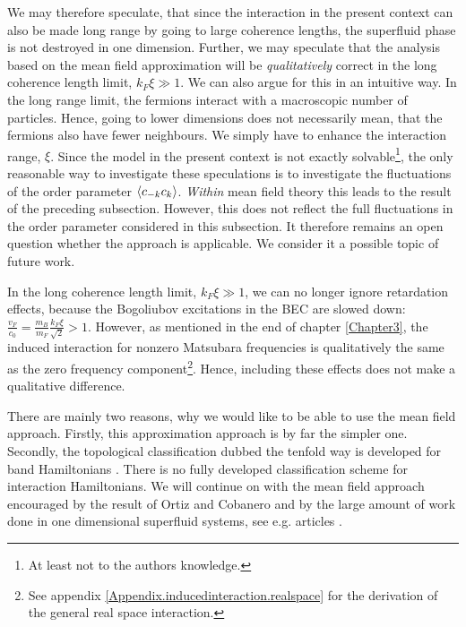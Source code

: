 We may therefore speculate, that since the interaction in the present context can also be made long range by going to large coherence lengths, the superfluid phase is not destroyed in one dimension. Further, we may speculate that the analysis based on the mean field approximation will be \textit{qualitatively} correct in the long coherence length limit, $k_F\xi \gg 1$. We can also argue for this in an intuitive way. In the long range limit, the fermions interact with a macroscopic number of particles. Hence, going to lower dimensions does not necessarily mean, that the fermions also have fewer neighbours. We simply have to enhance the interaction range, $\xi$. Since the model in the present context is not exactly solvable\footnote{At least not to the authors knowledge.}, the only reasonable way to investigate these speculations is to investigate the fluctuations of the order parameter $\braket{c_{-k}c_k}$. \textit{Within} mean field theory this leads to the result of the preceding subsection. However, this does not reflect the full fluctuations in the order parameter considered in this subsection. It therefore remains an open question whether the approach is applicable. We consider it a possible topic of future work. 

In the long coherence length limit, $k_F\xi \gg 1$, we can no longer ignore retardation effects, because the Bogoliubov excitations in the BEC are slowed down: $\frac{v_F}{c_0} = \frac{m_B}{m_F}\frac{k_F\xi}{\sqrt{2}} > 1$. However, as mentioned in the end of chapter \ref{Chapter3}, the induced interaction for nonzero Matsubara frequencies is qualitatively the same as the zero frequency component\footnote{See appendix \ref{Appendix.inducedinteraction.realspace} for the derivation of the general real space interaction.}. Hence, including these effects does not make a qualitative difference.

There are mainly two reasons, why we would like to be able to use the mean field approach. Firstly, this approximation approach is by far the simpler one. Secondly, the topological classification dubbed the tenfold way is developed for band Hamiltonians \cite{Ryu.Topology}. There is no fully developed classification scheme for interaction Hamiltonians. We will continue on with the mean field approach encouraged by the result of Ortiz and Cobanero and by the large amount of work done in one dimensional superfluid systems, see e.g. articles \cite{Alicea, KitaevTopPhases, KitaevQuantumWires, LiYangChen, FuKane2006, GreiterIsingKitaevChain, DeGottardiMajoranaFermions, BudichTopInvMajoranaWires, ZhangWu}. 


